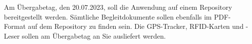 Am Übergabetag, den 20.07.2023, soll die Anwendung auf einem Repository bereitgestellt werden.
Sämtliche Begleitdokumente sollen ebenfalls im PDF-Format auf dem Repository zu finden sein.
Die GPS-Tracker, RFID-Karten und -Leser sollen am Übergabetag an Sie ausliefert werden.